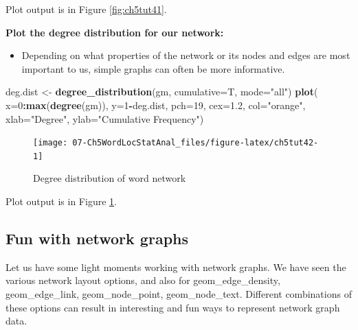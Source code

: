 \documentclass[
]{article}
\newenvironment{Shaded}{\begin{snugshade}}{\end{snugshade}}
\newcommand{\AttributeTok}[1]{\textcolor[rgb]{0.13,0.29,0.53}{#1}}
\newcommand{\DecValTok}[1]{\textcolor[rgb]{0.00,0.00,0.81}{#1}}
\newcommand{\FloatTok}[1]{\textcolor[rgb]{0.00,0.00,0.81}{#1}}
\newcommand{\FunctionTok}[1]{\textcolor[rgb]{0.13,0.29,0.53}{\textbf{#1}}}
\newcommand{\NormalTok}[1]{#1}
\newcommand{\OtherTok}[1]{\textcolor[rgb]{0.56,0.35,0.01}{#1}}
\newcommand{\SpecialCharTok}[1]{\textcolor[rgb]{0.81,0.36,0.00}{\textbf{#1}}}
\newcommand{\StringTok}[1]{\textcolor[rgb]{0.31,0.60,0.02}{#1}}
\providecommand{\tightlist}{%
  \setlength{\itemsep}{0pt}\setlength{\parskip}{0pt}}
\begin{document}
Plot output is in Figure \ref{fig:ch5tut41}.

\textbf{Plot the degree distribution for our network:}

\begin{itemize}
\tightlist
\item
  Depending on what properties of the network or its nodes and edges are most important to us, simple graphs can often be more informative.
\end{itemize}

\begin{Shaded}
\begin{Highlighting}[]
\NormalTok{deg.dist }\OtherTok{\textless{}{-}} \FunctionTok{degree\_distribution}\NormalTok{(gm, }\AttributeTok{cumulative=}\NormalTok{T, }\AttributeTok{mode=}\StringTok{"all"}\NormalTok{)}
\FunctionTok{plot}\NormalTok{( }\AttributeTok{x=}\DecValTok{0}\SpecialCharTok{:}\FunctionTok{max}\NormalTok{(}\FunctionTok{degree}\NormalTok{(gm)), }\AttributeTok{y=}\DecValTok{1}\SpecialCharTok{{-}}\NormalTok{deg.dist, }\AttributeTok{pch=}\DecValTok{19}\NormalTok{, }\AttributeTok{cex=}\FloatTok{1.2}\NormalTok{, }\AttributeTok{col=}\StringTok{"orange"}\NormalTok{, }
      \AttributeTok{xlab=}\StringTok{"Degree"}\NormalTok{, }\AttributeTok{ylab=}\StringTok{"Cumulative Frequency"}\NormalTok{)}
\end{Highlighting}
\end{Shaded}

\begin{figure}

{\centering \texttt{[image: 07-Ch5WordLocStatAnal\_files/figure-latex/ch5tut42-1]} 

}

\caption{Degree distribution of word network}\label{fig:ch5tut42}
\end{figure}

Plot output is in Figure \ref{fig:ch5tut42}.

\hypertarget{fun-with-network-graphs}{%
\subsection{Fun with network graphs}\label{fun-with-network-graphs}}

Let us have some light moments working with network graphs. We have seen the various network layout options, and also for geom\_edge\_density, geom\_edge\_link, geom\_node\_point, geom\_node\_text. Different combinations of these options can result in interesting and fun ways to represent network graph data.
\end{document}
